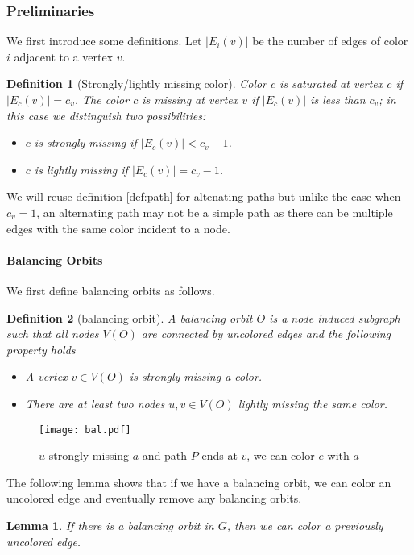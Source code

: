 \documentclass[titlepage, 11pt]{article}
\newtheorem{definition}{Definition}
\newtheorem{lemma}[theorem]{Lemma}
\begin{document}
\subsubsection{Preliminaries} \label{sec:struct}

We first introduce some definitions.
Let $|E_i(v)|$ be the number of edges of color $i$ adjacent to a vertex $v$.
\begin{definition}[Strongly/lightly missing color]
Color $c$ is \emph{saturated} at vertex $c$ if $|E_c(v)| = c_v$. The color $c$ is \emph{missing} at vertex $v$ if $|E_c(v)|$ is less than $c_v$; in this case we distinguish two possibilities: 
\begin{itemize}
\item $c$ is \emph{strongly missing} if $|E_c(v)| < c_v -1$. 
\item $c$ is \emph{lightly missing} if $|E_c(v)| = c_v -1$.
\end{itemize}
\end{definition} 



We will reuse definition \ref{def:path} for altenating paths but  unlike the case when $c_v = 1$, an alternating path may not be a simple path  as there can be multiple edges with the same color incident to a node.

\paragraph{Balancing Orbits}
\vspace{5pt}
We first define balancing orbits as follows.
\begin{definition}[balancing orbit] 
\label{def:balancing}
A \emph{balancing orbit} $O$ is a node induced subgraph such that 
all nodes $V(O)$ are connected by uncolored edges and the following property holds
\begin{itemize}
\item A vertex $v \in V(O)$ is strongly missing a color.
\item There are at least two nodes $u,v \in V(O)$ lightly missing the same color.
\end{itemize}
\end{definition}
\begin{figure}
\centering
\texttt{[image: bal.pdf]}
\caption{$u$ strongly missing $a$ and path $P$ ends at $v$, we can color $e$ with $a$}
\label{fig:bal}
\end{figure}
\vspace{0.2in}
The following lemma shows that if we have a balancing orbit, we can color
an uncolored edge and eventually remove any balancing orbits.
\begin{lemma}\label{lemma:balancing}
If there is a balancing orbit in $G$, then we can color a previously uncolored edge.
\end{lemma}
\end{document}
